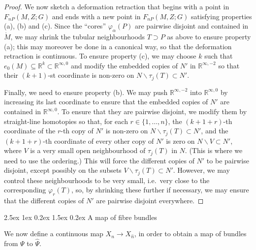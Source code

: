 \documentclass[reqno,a4paper]{article}
\makeatletter
\numberwithin{equation}{section}
\theoremstyle{italicised}
\theoremstyle{upright}
\theoremstyle{italicised-restate}
\renewcommand*{\subsection}{\@startsection{subsection}{2}{\z@}%
	{2.5ex \@plus 1ex \@minus 0.2ex}%
	{1.5ex \@plus 0.2ex}%
	{\normalfont\normalsize\bfseries}}
\newcommand{\bR}{\mathbb{R}}
\newcommand{\rinftyz}{\ensuremath{\bR^{\infty,0}}}
\newcommand{\rinftymt}{\ensuremath{\bR^{\infty,-2}}}
\makeatother
\begin{document}
\begin{proof}
We now sketch a deformation retraction that begins with a point in $F_{nP}(M,Z;G)$ and ends with a new point in $F_{nP}(M,Z;G)$ satisfying properties (a), (b) and (c). Since the ``cores'' $\varphi_\alpha(P)$ are pairwise disjoint and contained in $\mathring{M}$, we may shrink the tubular neighbourhoods $T \supset P$ as above to ensure property (a); this may moreover be done in a canonical way, so that the deformation retraction is continuous. To ensure property (c), we may choose $k$ such that $e_0(M) \subseteq \bR^k \subset \rinftyz$ and modify the embedded copies of $N'$ in $\rinftymt$ so that their $(k+1)$-st coordinate is non-zero on $N \smallsetminus \tau_j(T) \subset N'$.

Finally, we need to ensure property (b). We may push $\rinftymt$ into $\rinftyz$ by increasing its last coordinate to ensure that the embedded copies of $N'$ are contained in $\rinftyz$. To ensure that they are pairwise disjoint, we modify them by straight-line homotopies so that, for each $r \in \{1,\ldots,n\}$, the $(k+1+r)$-th coordinate of the $r$-th copy of $N'$ is non-zero on $N \smallsetminus \tau_j(T) \subset N'$, and the $(k+1+r)$-th coordinate of every other copy of $N'$ is zero on $N \smallsetminus V \subset N'$, where $V$ is a very small open neighbourhood of $\tau_j(T)$ in $N$. (This is where we need to use the ordering.) This will force the different copies of $N'$ to be pairwise disjoint, except possibly on the subsets $V \smallsetminus \tau_j(T) \subset N'$. However, we may control these neighbourhoods to be very small, i.e.\ very close to the corresponding $\varphi_r(T)$, so, by shrinking these further if necessary, we may ensure that the different copies of $N'$ are pairwise disjoint everywhere.
\end{proof}


\subsection{A map of fibre bundles}


We now define a continuous map $X_n \to X_{\hat{n}}$, in order to obtain a map of bundles from $\Psi$ to $\hat{\Psi}$.
\end{document}
